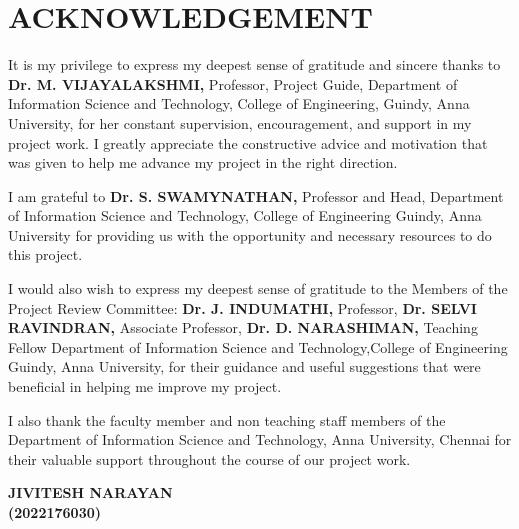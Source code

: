 \chapter*{\uppercase{ACKNOWLEDGEMENT}}
\begin{spacing}{1.5}
\begin{sloppypar}
It is my privilege to express my deepest sense of gratitude and sincere
thanks to {\textbf{Dr. M. VIJAYALAKSHMI,}} Professor, Project Guide, Department of Information Science and Technology, College of Engineering, Guindy, Anna University, for her constant supervision, encouragement, and support in my project work. I greatly appreciate the constructive advice and motivation that was given to help me advance my project in the right direction.

I am grateful to {\textbf{Dr. S. SWAMYNATHAN,}} Professor and Head, Department
of Information Science and Technology, College of Engineering Guindy, Anna University for providing us with the opportunity and necessary resources to do this project.

I would also wish to express my deepest sense of gratitude to the
Members of the Project Review Committee: {\textbf{Dr. J. INDUMATHI,}} Professor, {\textbf{Dr. SELVI RAVINDRAN,}} Associate Professor, {\textbf{Dr. D. NARASHIMAN,}} Teaching Fellow Department of Information Science and Technology,College of Engineering Guindy, Anna University, for their guidance and useful suggestions that were beneficial in helping me improve my project.

I also thank the faculty member and non teaching staff members of the Department of Information Science and Technology, Anna University, Chennai for their valuable support throughout the course of our project work.
\begin{flushright}
 {\textbf{JIVITESH NARAYAN}}\\
 {\textbf{(2022176030)}} 
\end{flushright}

                                                     
\end{sloppypar}
\end{spacing}